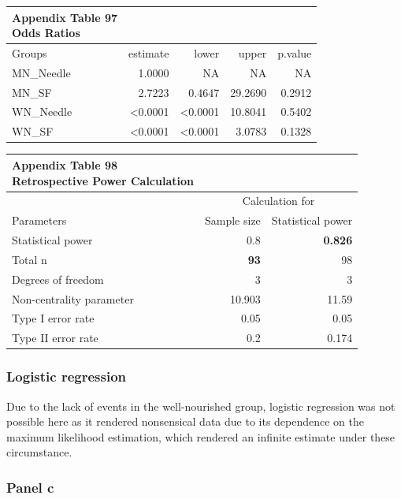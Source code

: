 \documentclass[
  12pt,
  letterpaper,
]{article}
\begin{document}
\begin{longtable}{l|rrrr}
\caption*{
{\large \textbf{Appendix Table 97}} \\ 
{\small \textbf{Odds Ratios}}
} \\ 
\toprule
\multicolumn{1}{l}{Groups} & estimate & lower & upper & p.value \\ 
\midrule\addlinespace[2.5pt]
MN\_Needle & 1.0000 & NA & NA & NA \\ 
MN\_SF & 2.7223 & 0.4647 & 29.2690 & 0.2912 \\ 
WN\_Needle & <0.0001 & <0.0001 & 10.8041 & 0.5402 \\ 
WN\_SF & <0.0001 & <0.0001 &  3.0783 & 0.1328 \\ 
\bottomrule
\end{longtable}

\begin{longtable}{l|rr}
\caption*{
{\large \textbf{Appendix Table 98}} \\ 
{\small \textbf{Retrospective Power Calculation}}
} \\ 
\toprule
\multicolumn{1}{l}{} & \multicolumn{2}{c}{Calculation for} \\ 
\cmidrule(lr){2-3}
\multicolumn{1}{l}{Parameters} & Sample size & Statistical power \\ 
\midrule\addlinespace[2.5pt]
Statistical power & 0.8 & \textbf{0.826} \\ 
Total n & \textbf{93} & 98 \\ 
Degrees of freedom & 3 & 3 \\ 
Non-centrality parameter & 10.903 & 11.59 \\ 
Type I error rate & 0.05 & 0.05 \\ 
Type II error rate & 0.2 & 0.174 \\ 
\bottomrule
\end{longtable}

\subsubsection{Logistic regression}\label{logistic-regression-2}

Due to the lack of events in the well-nourished group, logistic regression was not possible here as it rendered nonsensical data due to its dependence on the maximum likelihood estimation, which rendered an infinite estimate under these circumstance.

\subsubsection{Panel c}\label{panel-c-1}
\end{document}
